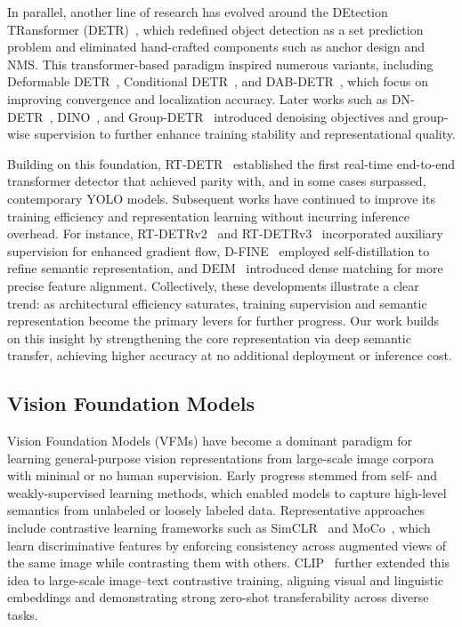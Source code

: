 In parallel, another line of research has evolved around the DEtection TRansformer (DETR)~\cite{carion2020end}, which redefined object detection as a set prediction problem and eliminated hand-crafted components such as anchor design and NMS. This transformer-based paradigm inspired numerous variants, including Deformable DETR~\cite{zhu2020deformable}, Conditional DETR~\cite{meng2021conditional}, and DAB-DETR~\cite{liu2022dab}, which focus on improving convergence and localization accuracy. Later works such as DN-DETR~\cite{li2022dn}, DINO~\cite{zhang2022dino}, and Group-DETR~\cite{chen2023group} introduced denoising objectives and group-wise supervision to further enhance training stability and representational quality.

Building on this foundation, RT-DETR~\cite{zhao2024detrs} established the first real-time end-to-end transformer detector that achieved parity with, and in some cases surpassed, contemporary YOLO models. Subsequent works have continued to improve its training efficiency and representation learning without incurring inference overhead. For instance, RT-DETRv2~\cite{lv2024rt} and RT-DETRv3~\cite{wang2025rt} incorporated auxiliary supervision for enhanced gradient flow, D-FINE~\cite{peng2024d} employed self-distillation to refine semantic representation, and DEIM~\cite{huang2025deim} introduced dense matching for more precise feature alignment.
Collectively, these developments illustrate a clear trend: as architectural efficiency saturates, training supervision and semantic representation become the primary levers for further progress. Our work builds on this insight by strengthening the core representation via deep semantic transfer, achieving higher accuracy at no additional deployment or inference cost.

\subsection{Vision Foundation Models}
Vision Foundation Models (VFMs) have become a dominant paradigm for learning general-purpose vision representations from large-scale image corpora with minimal or no human supervision. Early progress stemmed from self- and weakly-supervised learning methods, which enabled models to capture high-level semantics from unlabeled or loosely labeled data. Representative approaches include contrastive learning frameworks such as SimCLR~\cite{chen2020simple} and MoCo~\cite{he2020momentum}, which learn discriminative features by enforcing consistency across augmented views of the same image while contrasting them with others. CLIP~\cite{radford2021learning} further extended this idea to large-scale image–text contrastive training, aligning visual and linguistic embeddings and demonstrating strong zero-shot transferability across diverse tasks.

